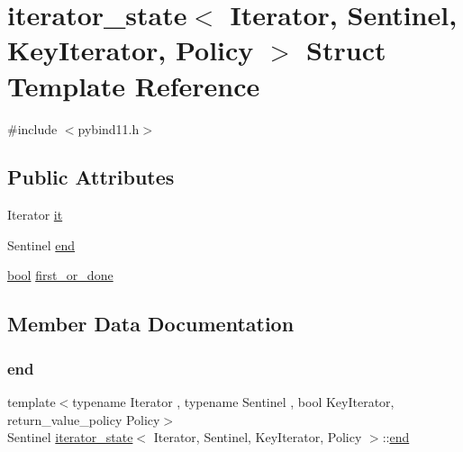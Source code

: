 \hypertarget{structiterator__state}{}\section{iterator\+\_\+state$<$ Iterator, Sentinel, Key\+Iterator, Policy $>$ Struct Template Reference}
\label{structiterator__state}


{\ttfamily \#include $<$pybind11.\+h$>$}

\subsection*{Public Attributes}
\begin{DoxyCompactItemize}
\item 
Iterator \mbox{\hyperlink{structiterator__state_a0d013710bcb43a9d705d82d30fa37aea}{it}}
\item 
Sentinel \mbox{\hyperlink{structiterator__state_ae41094904bdf5b2357845a8283cca692}{end}}
\item 
\mbox{\hyperlink{asdl_8h_af6a258d8f3ee5206d682d799316314b1}{bool}} \mbox{\hyperlink{structiterator__state_a466f9a59dcdaefb00103814afbe8fae7}{first\+\_\+or\+\_\+done}}
\end{DoxyCompactItemize}


\subsection{Member Data Documentation}
\mbox{\label{structiterator__state_ae41094904bdf5b2357845a8283cca692}} 
\subsubsection{\texorpdfstring{end}{end}}
{\footnotesize\ttfamily template$<$typename Iterator , typename Sentinel , bool Key\+Iterator, return\+\_\+value\+\_\+policy Policy$>$ \\
Sentinel \mbox{\hyperlink{structiterator__state}{iterator\+\_\+state}}$<$ Iterator, Sentinel, Key\+Iterator, Policy $>$\+::\mbox{\hyperlink{_s_d_l__opengl_8h_a432111147038972f06e049e18a837002}{end}}}

